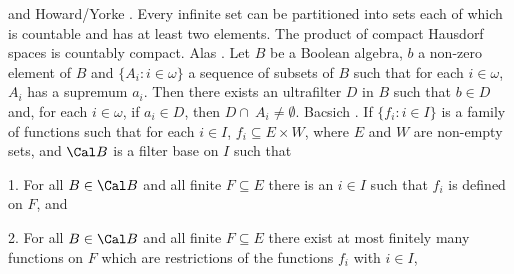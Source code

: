 \cite{1983} and \ac{Howard/Yorke} \cite{1989}.
\medskip
{} Every infinite set can be partitioned into sets
each of which is countable and has at least two elements.
\medskip
{} The product of compact Hausdorf spaces is
countably compact. \ac{Alas} \cite{1994}.
\medskip
{}  Let $B$ be a Boolean algebra, $b$ a non-zero
element of $B$ and $\{A_i: i\in\omega\}$ a sequence of subsets of $B$
such that for each $i\in\omega$, $A_i$ has a supremum $a_i$. Then there
exists an ultrafilter $D$ in $B$ such that $b\in D$ and, for each
$i\in\omega$, if $a_i\in D$, then $D\cap\ A_i\neq\emptyset$.
\ac{Bacsich} \cite{1972b}.
\medskip
{} If $\{f_i: i\in I\}$ is a family of functions
such that for each $i\in I$, $f_i\subseteq E\times W$, where $E$ and
$W$ are non-empty sets, and $\Cal B$ is a filter base on $I$ such that
\item {1.} For all $B\in\Cal B$ and all finite $F\subseteq E$ there
is an $i\in I$ such that $f_i$ is defined on $F$, and
\item {2.} For all $B \in\Cal B$ and all finite $F\subseteq E$ there
exist at most finitely many functions on $F$ which are restrictions
of the functions $f_i$ with $i\in I$,

